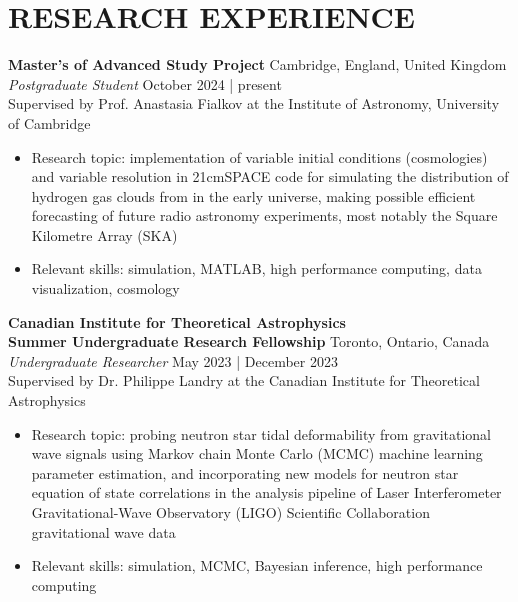 \documentclass[a4paper,10pt]{extarticle}
\begin{document}
\section*{RESEARCH EXPERIENCE}
\textbf{Master's of Advanced Study Project} \hfill Cambridge, England, United Kingdom\\
\textit{Postgraduate Student} \hfill October 2024 | present\\
Supervised by Prof. Anastasia Fialkov at the Institute of Astronomy, University of Cambridge
\begin{itemize}
    \item Research topic: implementation of variable initial conditions (cosmologies) and variable resolution in 21cmSPACE code for simulating the distribution of hydrogen gas clouds from in the early universe, making possible efficient forecasting of future radio astronomy experiments, most notably the Square Kilometre Array (SKA)
    
    \item Relevant skills: simulation, MATLAB, high performance computing, data visualization, cosmology
\end{itemize}

\textbf{Canadian Institute for Theoretical Astrophysics\\
    Summer Undergraduate Research Fellowship} \hfill Toronto, Ontario, Canada\\
\textit{Undergraduate Researcher} \hfill May 2023 | December 2023\\
Supervised by Dr. Philippe Landry at the Canadian Institute for Theoretical Astrophysics
\begin{itemize}
    \item Research topic: probing neutron star tidal deformability from gravitational wave signals using Markov chain Monte Carlo (MCMC) machine learning parameter estimation, and incorporating new models for neutron star equation of state correlations in the analysis pipeline of Laser Interferometer Gravitational-Wave Observatory (LIGO) Scientific Collaboration gravitational wave data

    \item Relevant skills: simulation, MCMC, Bayesian inference, high performance computing
\end{itemize}
\end{document}

